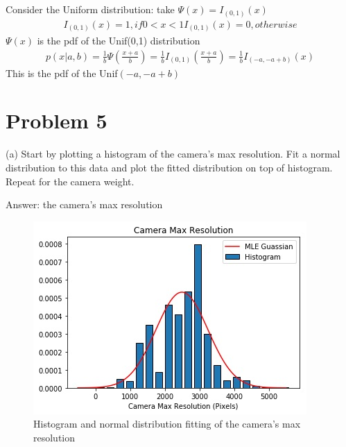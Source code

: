 \documentclass{article}
\begin{document}
Consider the Uniform distribution:
take $\Psi(x) = I_{(0,1)}(x)$
\begin{equation}
\begin{aligned}
    I_{(0,1)}(x) = 1, if 0<x<1
    I_{(0,1)}(x) = 0, otherwise
\end{aligned}
\end{equation}
$\Psi(x)$ is the pdf of the Unif(0,1) distribution
\begin{equation}
\begin{aligned}
p(x|a,b) = \frac{1}{b}\Psi\left(\frac{x+a}{b}\right) = \frac{1}{b}I_{(0,1)}\left(\frac{x+a}{b}\right) = \frac{1}{b}I_{(-a,-a+b)}(x)
\end{aligned}
\end{equation}
This is the pdf of the Unif$(-a,-a+b)$
\newpage
\section{Problem 5}
(a) Start by plotting a histogram of the camera's max resolution. Fit a normal distribution to this data and plot the fitted distribution on top of histogram. Repeat for the camera weight.

Answer:
the camera's max resolution
\begin{figure}[ht]
\centering
\includegraphics[scale=0.5]{w5a1.jpg}
\caption{Histogram and normal distribution fitting of the camera's max resolution}
\end{figure}
\end{document}
